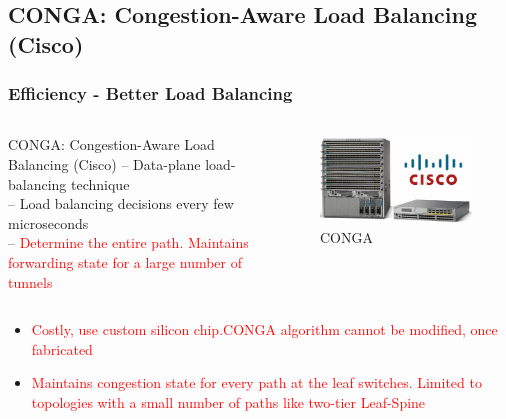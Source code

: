 \documentclass{beamer}
\begin{document}
\subsection{CONGA: Congestion-Aware Load Balancing (Cisco)}
\begin{frame}
	\frametitle{Efficiency - Better Load Balancing}
	\begin{columns}[T] %
		\begin{column}[T]{7cm} 
			\begin{block}{CONGA: Congestion-Aware Load Balancing (Cisco)}
				--  Data-plane load-balancing technique  \\
				--  Load balancing decisions every few microseconds \\
				--  \textcolor{red}{Determine the entire path. Maintains forwarding state for a large number of tunnels}
			\end{block}
		\end{column}
		\begin{column}[T]{5cm} 
			\begin{figure}
				\includegraphics[scale=0.35]{6}
				\caption{CONGA}
			\end{figure}
		\end{column}
	\end{columns}
	\medskip
	\begin{itemize}
		\item\textcolor{red}{Costly, use custom silicon chip.CONGA algorithm cannot be modified, once fabricated} \\
		\item\textcolor{red}{ Maintains congestion state for every path at the leaf switches. Limited to topologies with a small number of paths like two-tier Leaf-Spine}
	\end{itemize}
\end{frame}
\end{document}
